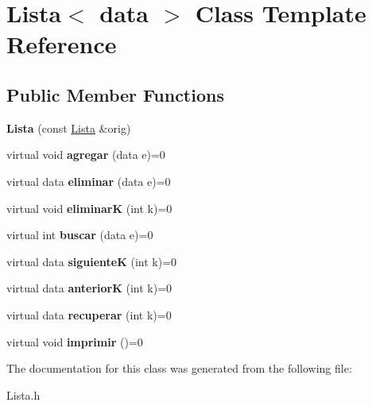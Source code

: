 \hypertarget{class_lista}{}\section{Lista$<$ data $>$ Class Template Reference}
\label{class_lista}
\subsection*{Public Member Functions}
\begin{DoxyCompactItemize}
\item 
{\bfseries Lista} (const \hyperlink{class_lista}{Lista} \&orig)\hypertarget{class_lista_a29861d39fe1041536cc31151411fbd2f}{}\label{class_lista_a29861d39fe1041536cc31151411fbd2f}

\item 
virtual void {\bfseries agregar} (data e)=0\hypertarget{class_lista_ae123641fd2cf412a28422c5d2109dc34}{}\label{class_lista_ae123641fd2cf412a28422c5d2109dc34}

\item 
virtual data {\bfseries eliminar} (data e)=0\hypertarget{class_lista_ab5d3dc93d05a2e969a1922d3c0d883b9}{}\label{class_lista_ab5d3dc93d05a2e969a1922d3c0d883b9}

\item 
virtual void {\bfseries eliminarK} (int k)=0\hypertarget{class_lista_a6b1f3426df910f5383e3e44bc1ab5a24}{}\label{class_lista_a6b1f3426df910f5383e3e44bc1ab5a24}

\item 
virtual int {\bfseries buscar} (data e)=0\hypertarget{class_lista_a948ee3d7127876b1b210e1d279722f1a}{}\label{class_lista_a948ee3d7127876b1b210e1d279722f1a}

\item 
virtual data {\bfseries siguienteK} (int k)=0\hypertarget{class_lista_adaf643bca7bece7dcf69c3b99c55e321}{}\label{class_lista_adaf643bca7bece7dcf69c3b99c55e321}

\item 
virtual data {\bfseries anteriorK} (int k)=0\hypertarget{class_lista_a970b00e49ad164dc967c6978e8f8751d}{}\label{class_lista_a970b00e49ad164dc967c6978e8f8751d}

\item 
virtual data {\bfseries recuperar} (int k)=0\hypertarget{class_lista_a6e9e8e5325bc0a23e1d9f05784375c78}{}\label{class_lista_a6e9e8e5325bc0a23e1d9f05784375c78}

\item 
virtual void {\bfseries imprimir} ()=0\hypertarget{class_lista_aeb8994a0051aa98257abdc2b44eece87}{}\label{class_lista_aeb8994a0051aa98257abdc2b44eece87}

\end{DoxyCompactItemize}


The documentation for this class was generated from the following file\+:\begin{DoxyCompactItemize}
\item 
Lista.\+h\end{DoxyCompactItemize}
